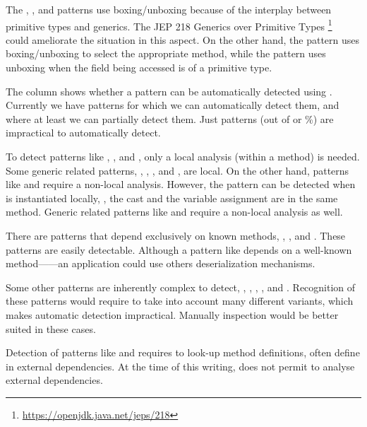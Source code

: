 The
,
, and
patterns use boxing/unboxing because of the interplay between primitive types and generics.
The JEP 218 Generics over Primitive Types%
\footnote{\url{https://openjdk.java.net/jeps/218}}~\citep{jep218}
could ameliorate the situation in this aspect.
On the other hand, 
the  pattern uses boxing/unboxing to select the appropriate method,
while the  pattern
uses unboxing when the field being accessed is of a primitive type.

The \gh{\ql{}} column shows whether a pattern can be automatically detected using \ql{}.
Currently we have \nCmarkCount{} patterns for which we can automatically detect them, and
\nExisCount{} where at least we can partially detect them.
Just \nXmarkCount{} patterns (out of \nPattern{} or \nXmarkPerc{}\%) are impractical to automatically detect.

To detect patterns like
,
, and
,
only a local analysis (within a method) is needed.
Some generic related patterns, \eg{},
,
, and
,
are local.
On the other hand,
patterns like  and
 require a non-local analysis.
However, the  pattern can be detected when
is instantiated locally, \ie{},
the cast and the variable assignment are in the same method.
Generic related patterns like  and  require a non-local analysis as well.

There are patterns that depend exclusively on known methods, \eg{},
, and
.
These patterns are easily detectable.
Although a pattern like  depends on a well-known method------an application could use others deserialization mechanisms.

Some other patterns are inherently complex to detect, \eg{},
,
,
, and
.
Recognition of these patterns would require to take into account many different variants,
which makes automatic detection impractical.
Manually inspection would be better suited in these cases. 

Detection of patterns like  and  requires to look-up method definitions,
often define in external dependencies.
At the time of this writing, \ql{} does not permit to analyse external dependencies.
